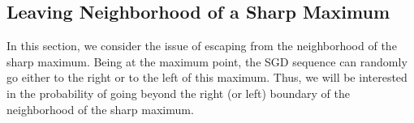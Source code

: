 \documentclass{article}
\theoremstyle{plain}
\theoremstyle{definition}
\theoremstyle{remark}
\newtheorem{remark}[theorem]{Remark}
\newtheorem{example}[theorem]{Example}
\begin{document}







\subsection{Leaving Neighborhood of a Sharp Maximum}\label{sec_sharp_max}
In this section, we consider the issue of escaping from the neighborhood of the sharp maximum. Being at the maximum point, the SGD sequence  can randomly go either to the right or to the left of this maximum. Thus, we will be interested in the probability of going beyond the right (or left) boundary of the neighborhood of the sharp maximum. 
\end{document}
